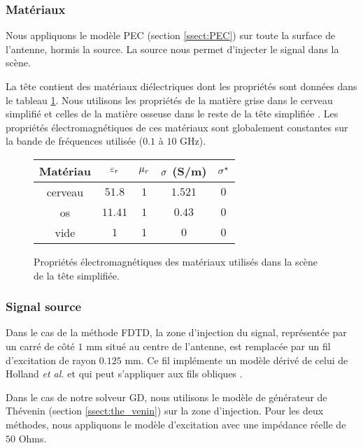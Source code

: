 \subsubsection{Matériaux}

Nous appliquons le modèle PEC (section \ref{ssect:PEC}) sur
toute la surface de l'antenne, hormis la source.
La source nous permet d'injecter le signal dans la scène.

La tête contient des matériaux diélectriques dont les propriétés sont données dans le tableau \ref{tab:proprietes_mat_tete}. Nous utilisons les propriétés
de la matière grise dans le cerveau simplifié et celles
de la matière osseuse dans le reste de la tête simplifiée \cite{Gabriel1}.
Les propriétés électromagnétiques de ces matériaux sont
globalement constantes sur la bande de fréquences utilisée ($0.1$ à $10$ GHz).


\begin{figure}[!h]
	\begin{center}
		\caption{
			\label{tab:proprietes_mat_tete}
			Propriétés électromagnétiques des matériaux utilisés
			dans la scène de la tête simplifiée.
		}
		
		\begin{tabular}{|c|c|c|c|c|}
			\hline
			Matériau & $\varepsilon_r$ & $\mu_r$ & $\sigma$ (S/m) & $\sigma^\star$ \\ \hline\hline
			cerveau & $51.8$ & $1$ & $1.521$ & $0$ \\	\hline
			os & $11.41$ & $1$ & $0.43$ & $0$ \\	\hline
			vide & $1$ & $1$ & $0$ & $0$ \\	\hline
		\end{tabular}
	\end{center}
\end{figure}



\subsubsection{Signal source}

Dans le cas de la méthode FDTD, la zone d'injection
du signal, représentée par un carré de côté $1$ mm
situé au centre de l'antenne,
est remplacée par un fil d'excitation de rayon $0.125$ mm.
Ce fil implémente un modèle dérivé de celui de Holland \textit{et al.} \cite{4091427}
et qui peut s'appliquer aux fils obliques \cite{guiffaut:hal-00624720}.

Dans le cas de notre solveur GD, nous utilisons
le modèle de générateur de Thévenin (section \ref{ssect:the_venin})
sur la zone d'injection.
Pour les deux méthodes, nous appliquons le modèle
d'excitation avec une impédance réelle de $50$ Ohms.
\\

